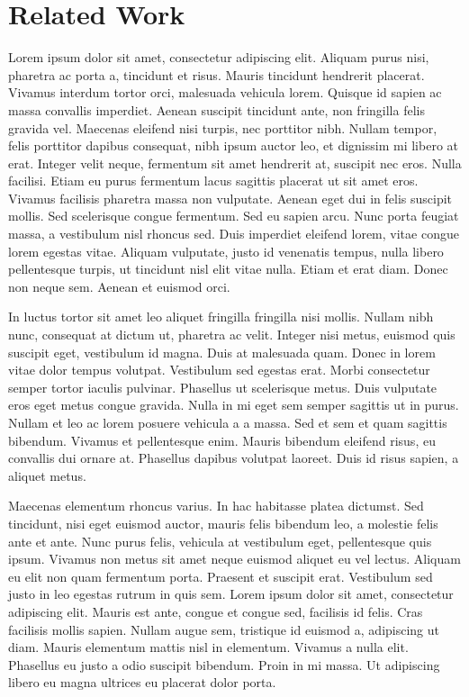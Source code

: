 \chapter{Related Work}
Lorem ipsum dolor sit amet, consectetur adipiscing elit.
Aliquam purus nisi, pharetra ac porta a, tincidunt et risus.
Mauris tincidunt hendrerit placerat.
Vivamus interdum tortor orci, malesuada vehicula lorem.
Quisque id sapien ac massa convallis imperdiet.
Aenean suscipit tincidunt ante, non fringilla felis gravida vel.
Maecenas eleifend nisi turpis, nec porttitor nibh.
Nullam tempor, felis porttitor dapibus consequat, nibh ipsum auctor leo, et dignissim mi libero at erat.
Integer velit neque, fermentum sit amet hendrerit at, suscipit nec eros.
Nulla facilisi.
Etiam eu purus fermentum lacus sagittis placerat ut sit amet eros.
Vivamus facilisis pharetra massa non vulputate.
Aenean eget dui in felis suscipit mollis.
Sed scelerisque congue fermentum.
Sed eu sapien arcu.
Nunc porta feugiat massa, a vestibulum nisl rhoncus sed.
Duis imperdiet eleifend lorem, vitae congue lorem egestas vitae.
Aliquam vulputate, justo id venenatis tempus, nulla libero pellentesque turpis, ut tincidunt nisl elit vitae nulla.
Etiam et erat diam.
Donec non neque sem.
Aenean et euismod orci.

In luctus tortor sit amet leo aliquet fringilla fringilla nisi mollis.
Nullam nibh nunc, consequat at dictum ut, pharetra ac velit.
Integer nisi metus, euismod quis suscipit eget, vestibulum id magna.
Duis at malesuada quam.
Donec in lorem vitae dolor tempus volutpat.
Vestibulum sed egestas erat.
Morbi consectetur semper tortor iaculis pulvinar.
Phasellus ut scelerisque metus.
Duis vulputate eros eget metus congue gravida.
Nulla in mi eget sem semper sagittis ut in purus.
Nullam et leo ac lorem posuere vehicula a a massa.
Sed et sem et quam sagittis bibendum.
Vivamus et pellentesque enim.
Mauris bibendum eleifend risus, eu convallis dui ornare at.
Phasellus dapibus volutpat laoreet.
Duis id risus sapien, a aliquet metus.

Maecenas elementum rhoncus varius.
In hac habitasse platea dictumst.
Sed tincidunt, nisi eget euismod auctor, mauris felis bibendum leo, a molestie felis ante et ante.
Nunc purus felis, vehicula at vestibulum eget, pellentesque quis ipsum.
Vivamus non metus sit amet neque euismod aliquet eu vel lectus.
Aliquam eu elit non quam fermentum porta.
Praesent et suscipit erat.
Vestibulum sed justo in leo egestas rutrum in quis sem.
Lorem ipsum dolor sit amet, consectetur adipiscing elit.
Mauris est ante, congue et congue sed, facilisis id felis.
Cras facilisis mollis sapien.
Nullam augue sem, tristique id euismod a, adipiscing ut diam.
Mauris elementum mattis nisl in elementum.
Vivamus a nulla elit.
Phasellus eu justo a odio suscipit bibendum.
Proin in mi massa.
Ut adipiscing libero eu magna ultrices eu placerat dolor porta.

